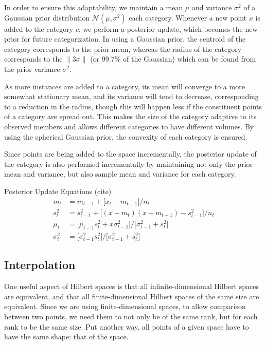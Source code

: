 \documentclass[runningheads]{llncs}
\begin{document}
In order to ensure this adaptability, we maintain a mean $\mu$ and variance $\sigma^2$ of a Gaussian prior distribution $\mathcal{N}(\mu,\sigma^2)$ each category.  Whenever a new point $x$ is added to the category $c$, we perform a posterior update, which becomes the new prior for future categorization.  In using a Gaussian prior, the centroid of the category corresponds to the prior mean, whereas the radius of the category corresponds to the $\|3\sigma\|$ (or 99.7\% of the Gaussian) which can be found from the prior variance $\sigma^2$.

As more instances are added to a category, its mean will converge to a more somewhat stationary mean, and its variance will tend to decrease, corresponding to a reduction in the radius, though this will happen less if the constituent points of a category are spread out.  This makes the size of the category adaptive to its observed members and allows different categories to have different volumes.  By using the spherical Gaussian prior, the convexity of each category is ensured.

Since points are being added to the space incrementally, the posterior update of the category is also performed incrementally by maintaining not only the prior mean and variance, but also sample mean and variance for each category.

Posterior Update Equations (cite)
  \begin{align}
    m_t &= m_{t-1} + \big[ x_t - m_{t-1} \big] / n_t 
      \tag*{(Sample Mean)} \\
    s_t^2 &= s_{t-1}^2 + \big[ (x - m_t)(x - m_{t-1}) - s_{t-1}^2 \big] / n_t
      \tag*{(Sample Variance)} \\
    \mu_t &= \big[ \mu_{t-1} s_t^2 + x \sigma_{t-1}^2 \big] / \big[ \sigma_{t-1}^2 + s_t^2 \big]
      \tag*{(Posterior Mean)} \\
    \sigma_t^2 &= \big[ \sigma_{t-1}^2 s_t^2 \big] / \big[ \sigma_{t-1}^2 + s_t^2 \big]
      \tag*{(Posterior Variance)}
  \end{align}


\subsection{Interpolation}

One useful aspect of Hilbert spaces is that all infinite-dimensional Hilbert spaces are equivalent, and that all finite-dimensional Hilbert spaces of the same size are equivalent.  Since we are using finite-dimensional spaces, to allow comparison between two points, we need them to not only be of the same rank, but for each rank to be the same size.  Put another way, all points of a given space have to have the same shape: that of the space.
\end{document}
